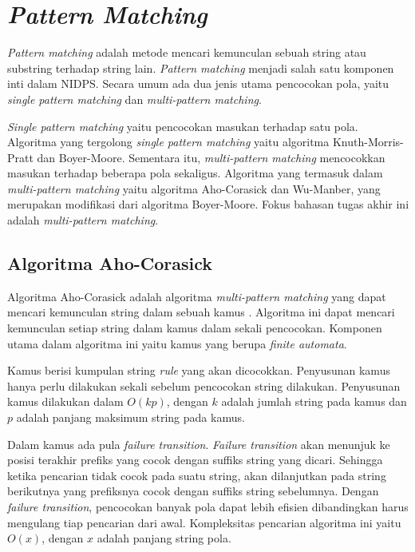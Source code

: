 
\section{\emph{Pattern Matching}}

  \emph{Pattern matching} adalah metode mencari kemunculan sebuah string atau substring terhadap string lain. \emph{Pattern matching} menjadi salah satu komponen inti dalam NIDPS. Secara umum ada dua jenis utama pencocokan pola, yaitu \emph{single pattern matching} dan \emph{multi-pattern matching}. 
  
  \emph{Single pattern matching} yaitu pencocokan masukan terhadap satu pola. Algoritma yang tergolong \emph{single pattern matching} yaitu algoritma Knuth-Morris-Pratt dan Boyer-Moore. Sementara itu, \emph{multi-pattern matching} mencocokkan masukan terhadap beberapa pola sekaligus. Algoritma yang termasuk dalam \emph{multi-pattern matching} yaitu algoritma Aho-Corasick dan Wu-Manber, yang merupakan modifikasi dari algoritma Boyer-Moore. Fokus bahasan tugas akhir ini adalah \emph{multi-pattern matching}.

  \subsection{Algoritma Aho-Corasick}

    Algoritma Aho-Corasick adalah algoritma \emph{multi-pattern matching} yang dapat mencari kemunculan string dalam sebuah kamus \citep{ahoc1975}. Algoritma ini dapat mencari kemunculan setiap string dalam kamus dalam sekali pencocokan. Komponen utama dalam algoritma ini yaitu kamus yang berupa \emph{finite automata}. %

    Kamus berisi kumpulan string \emph{rule} yang akan dicocokkan. Penyusunan kamus hanya perlu dilakukan sekali sebelum pencocokan string dilakukan. Penyusunan kamus dilakukan dalam $O(kp)$, dengan $k$ adalah jumlah string pada kamus dan $p$ adalah panjang maksimum string pada kamus.

    Dalam kamus ada pula \emph{failure transition}. \emph{Failure transition} akan menunjuk ke posisi terakhir prefiks yang cocok dengan suffiks string yang dicari. Sehingga ketika pencarian tidak cocok pada suatu string, akan dilanjutkan pada string berikutnya yang prefiksnya cocok dengan suffiks string sebelumnya. Dengan \emph{failure transition}, pencocokan banyak pola dapat lebih efisien dibandingkan harus mengulang tiap pencarian dari awal. Kompleksitas pencarian algoritma ini yaitu $O(x)$, dengan $x$ adalah panjang string pola.

